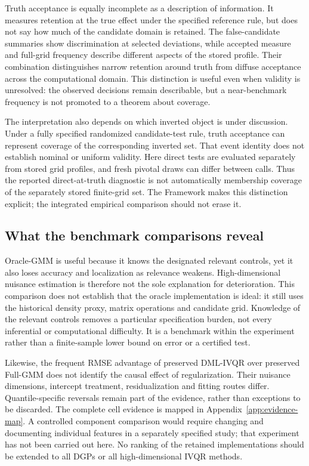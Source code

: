 Truth acceptance is equally incomplete as a description of information. It measures retention at the true effect under the specified reference rule, but does not say how much of the candidate domain is retained. The false-candidate summaries show discrimination at selected deviations, while accepted measure and full-grid frequency describe different aspects of the stored profile. Their combination distinguishes narrow retention around truth from diffuse acceptance across the computational domain. This distinction is useful even when validity is unresolved: the observed decisions remain describable, but a near-benchmark frequency is not promoted to a theorem about coverage.

The interpretation also depends on which inverted object is under discussion. Under a fully specified randomized candidate-test rule, truth acceptance can represent coverage of the corresponding inverted set. That event identity does not establish nominal or uniform validity. Here direct tests are evaluated separately from stored grid profiles, and fresh pivotal draws can differ between calls. Thus the reported direct-at-truth diagnostic is not automatically membership coverage of the separately stored finite-grid set. The Framework makes this distinction explicit; the integrated empirical comparison should not erase it.

\subsection{What the benchmark comparisons reveal}
Oracle-GMM is useful because it knows the designated relevant controls, yet it also loses accuracy and localization as relevance weakens. High-dimensional nuisance estimation is therefore not the sole explanation for deterioration. This comparison does not establish that the oracle implementation is ideal: it still uses the historical density proxy, matrix operations and candidate grid. Knowledge of the relevant controls removes a particular specification burden, not every inferential or computational difficulty. It is a benchmark within the experiment rather than a finite-sample lower bound on error or a certified test.

Likewise, the frequent RMSE advantage of preserved DML-IVQR over preserved Full-GMM does not identify the causal effect of regularization. Their nuisance dimensions, intercept treatment, residualization and fitting routes differ. Quantile-specific reversals remain part of the evidence, rather than exceptions to be discarded. The complete cell evidence is mapped in Appendix~\ref{app:evidence-map}. A controlled component comparison would require changing and documenting individual features in a separately specified study; that experiment has not been carried out here. No ranking of the retained implementations should be extended to all DGPs or all high-dimensional IVQR methods.

